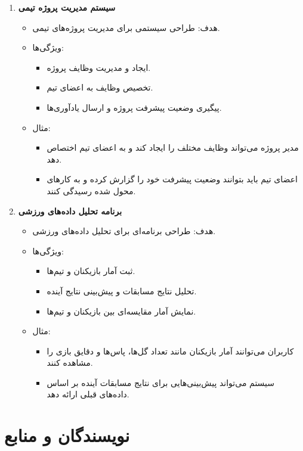 \documentclass[b5paper,12pt]{article}
\begin{document}
\begin{enumerate}
			\item \textbf{سیستم مدیریت پروژه تیمی}
			\begin{itemize}
				\item هدف: طراحی سیستمی برای مدیریت پروژه‌های تیمی.
				\item ویژگی‌ها:
				\begin{itemize}
					\item ایجاد و مدیریت وظایف پروژه.
					\item تخصیص وظایف به اعضای تیم.
					\item پیگیری وضعیت پیشرفت پروژه و ارسال یادآوری‌ها.
				\end{itemize}
				\item مثال:
				\begin{itemize}
					\item مدیر پروژه می‌تواند وظایف مختلف را ایجاد کند و به اعضای تیم اختصاص دهد.
					\item اعضای تیم باید بتوانند وضعیت پیشرفت خود را گزارش کرده و به کارهای محول شده رسیدگی کنند.
				\end{itemize}
			\end{itemize}
			
			\item \textbf{برنامه تحلیل داده‌های ورزشی}
			\begin{itemize}
				\item هدف: طراحی برنامه‌ای برای تحلیل داده‌های ورزشی.
				\item ویژگی‌ها:
				\begin{itemize}
					\item ثبت آمار بازیکنان و تیم‌ها.
					\item تحلیل نتایج مسابقات و پیش‌بینی نتایج آینده.
					\item نمایش آمار مقایسه‌ای بین بازیکنان و تیم‌ها.
				\end{itemize}
				\item مثال:
				\begin{itemize}
					\item کاربران می‌توانند آمار بازیکنان مانند تعداد گل‌ها، پاس‌ها و دقایق بازی را مشاهده کنند.
					\item سیستم می‌تواند پیش‌بینی‌هایی برای نتایج مسابقات آینده بر اساس داده‌های قبلی ارائه دهد.
				\end{itemize}
			\end{itemize}
			
		\end{enumerate}

		\newpage
		\section*{نویسندگان و منابع}
\end{document}
